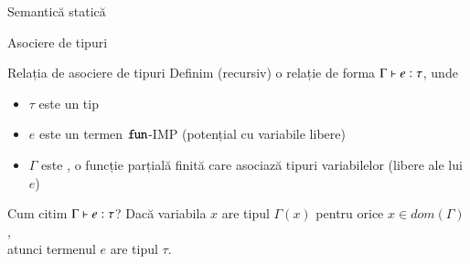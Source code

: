 \begin{section}{Semantică statică}

\begin{subsection}{Asociere de tipuri}
\begin{frame}{Relația de asociere de tipuri}
Definim (recursiv) o relație de forma ${\displaystyle {\Gamma} \vdash {e} : {\tau}}$, unde
\begin{itemize}
\item $\tau$ este un tip

\vspace{-2ex}
\begin{syntaxBlock}{\structure{\tau}}
\vspace{-4ex}
\end{syntaxBlock}
\item $e$ este un termen $\mathrel{\text{\ttfamily fun}}$-IMP (potențial cu variabile libere)
\item $\Gamma$ este , o funcție parțială finită care asociază tipuri variabilelor (libere ale lui $e$)
\end{itemize}

\begin{block}{Cum citim ${\displaystyle {\Gamma} \vdash {e} : {\tau}}$?}
Dacă variabila $x$ are tipul $\Gamma(x)$ pentru orice $x\in dom(\Gamma)$,\\ atunci termenul $e$ are tipul $\tau$.
\end{block}
\end{frame}



\end{subsection}
\end{section}

